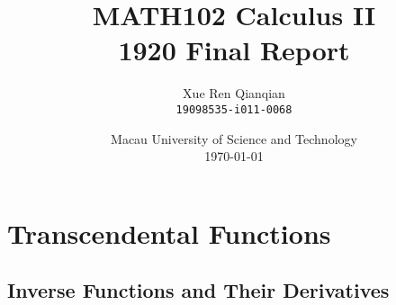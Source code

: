 \documentclass{report}
\title{MATH102 Calculus II \\1920 Final Report} %
\author{Xue Ren Qianqian\\ \texttt{19098535-i011-0068}} %
\date{Macau University of Science and Technology \\\today} %
\begin{document}
\maketitle %

\setcounter{chapter}{6}
\chapter{Transcendental  Functions}
\section{Inverse Functions and Their Derivatives} %
\end{document}
